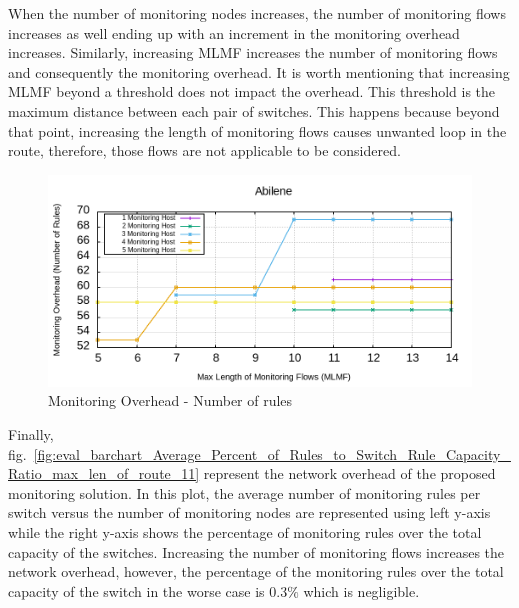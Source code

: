 \documentclass[10pt, journal, letterpaper]{IEEEtran}
\begin{document}
When the number of monitoring nodes increases, the number of monitoring flows increases as well ending up with an increment in the monitoring overhead increases. Similarly, increasing MLMF increases the number of monitoring flows and consequently the monitoring overhead. It is worth mentioning that increasing MLMF beyond a threshold does not impact the overhead. This threshold is the maximum distance between each pair of switches. This happens because beyond that point, increasing the length of monitoring flows causes unwanted loop in the route, therefore, those flows are not applicable to be considered.
\begin{figure}
    \centering
    \includegraphics[width=.9\columnwidth]{img/eval_Abilene_Max_Length_of_Routes_Number_of_Required_Rules.png}
    \caption{Monitoring Overhead - Number of rules}
    \label{fig:required_rules}
\end{figure}
Finally, fig.~\ref{fig:eval_barchart_Average_Percent_of_Rules_to_Switch_Rule_Capacity_Ratio_max_len_of_route_11} represent the network overhead of the proposed monitoring solution. In this plot, the average number of monitoring rules per switch versus the number of monitoring nodes are represented using left y-axis while the right y-axis shows the percentage of monitoring rules over the total capacity of the switches. Increasing the number of monitoring flows increases the network overhead, however, the percentage of the monitoring rules over the total capacity of the switch in the worse case is $0.3\%$ which is negligible.
\end{document}

